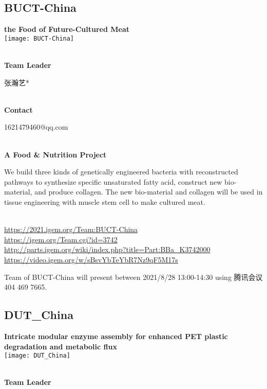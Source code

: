 \subsection{\textcolor{Blu}{ BUCT-China } }
\vspace{5mm}
\begin{center}
\large{
  \textbf{ the Food of Future-Cultured Meat }\\
  \texttt{[image: BUCT-China]}
}
\end{center}
\textbf{\\Team Leader}

  张瀚艺*


\textbf{\\Contact}

  1621479460@qq.com


\textbf{\\A Food & Nutrition Project\\}\begin{spacing}{1.5}

We build three kinds of genetically engineered bacteria with reconstructed pathways to synthesize specific unsaturated fatty acid, construct new bio-material, and produce collagen. The new bio-material and collagen will be used in tissue engineering with muscle stem cell to make cultured meat.\end{spacing}
\\

\url{https://2021.igem.org/Team:BUCT-China }\\
\url{https://igem.org/Team.cgi?id=3742 }\\
\url{http://parts.igem.org/wiki/index.php?title=Part:BBa_K3742000 }\\
\url{https://video.igem.org/w/sBsvYbTeYbR7Nz9qF5M17s }\\

\vfill{}









Team of BUCT-China will present between      2021/8/28 13:00-14:30   using 腾讯会议 404 469 7665.
\newpage


\subsection{\textcolor{Blu}{ DUT\_China } }
\vspace{5mm}
\begin{center}
\large{
  \textbf{ Intricate modular enzyme assembly for enhanced PET plastic degradation and metabolic flux }\\
  \texttt{[image: DUT\_China]}
}
\end{center}
\textbf{\\Team Leader}

